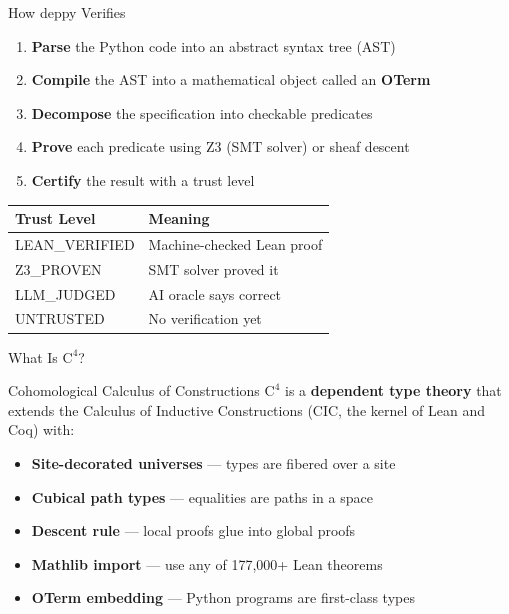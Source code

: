 \documentclass[aspectratio=169,11pt]{beamer}
\newcommand{\Cfour}{\mathrm{C}^4}
\begin{document}
\begin{frame}{How deppy Verifies}
\begin{enumerate}
\item \textbf{Parse} the Python code into an abstract syntax tree (AST)
\item \textbf{Compile} the AST into a mathematical object called an \textbf{OTerm}
\item \textbf{Decompose} the specification into checkable predicates
\item \textbf{Prove} each predicate using Z3 (SMT solver) or sheaf descent
\item \textbf{Certify} the result with a trust level
\end{enumerate}

\vspace{1em}
\begin{center}
\begin{tabular}{ll}
\toprule
\textbf{Trust Level} & \textbf{Meaning} \\
\midrule
\textcolor{trustgreen}{LEAN\_VERIFIED} & Machine-checked Lean proof \\
\textcolor{trustgreen}{Z3\_PROVEN} & SMT solver proved it \\
\textcolor{trustyellow}{LLM\_JUDGED} & AI oracle says correct \\
\textcolor{trustred}{UNTRUSTED} & No verification yet \\
\bottomrule
\end{tabular}
\end{center}
\end{frame}

\begin{frame}{What Is $\Cfour$?}
\begin{block}{Cohomological Calculus of Constructions}
$\Cfour$ is a \textbf{dependent type theory} that extends the Calculus of
Inductive Constructions (CIC, the kernel of Lean and Coq) with:

\begin{itemize}
\item \textbf{Site-decorated universes} --- types are fibered over a site
\item \textbf{Cubical path types} --- equalities are paths in a space
\item \textbf{Descent rule} --- local proofs glue into global proofs
\item \textbf{Mathlib import} --- use any of 177,000+ Lean theorems
\item \textbf{OTerm embedding} --- Python programs are first-class types
\end{itemize}
\end{block}
\end{frame}
\end{document}
